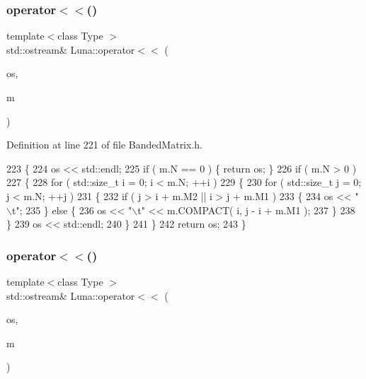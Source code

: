 \subsubsection{\texorpdfstring{operator$<$$<$()}{operator<<()}\hspace{0.1cm}{\footnotesize\ttfamily [2/5]}}
{\footnotesize\ttfamily template$<$class Type $>$ \\
std\+::ostream\& Luna\+::operator$<$$<$ (\begin{DoxyParamCaption}\item[{std\+::ostream \&}]{os,  }\item[{const \hyperlink{classLuna_1_1BandedMatrix}{Banded\+Matrix}$<$ Type $>$ \&}]{m }\end{DoxyParamCaption})\hspace{0.3cm}{\ttfamily [inline]}}



Definition at line 221 of file Banded\+Matrix.\+h.


\begin{DoxyCode}
223   \{
224     os << std::endl;
225     \textcolor{keywordflow}{if} ( m.N == 0 ) \{ \textcolor{keywordflow}{return} os; \}
226     \textcolor{keywordflow}{if} ( m.N > 0 )
227     \{
228       \textcolor{keywordflow}{for} ( std::size\_t i = 0; i < m.N; ++i )
229       \{
230         \textcolor{keywordflow}{for} ( std::size\_t j = 0; j < m.N; ++j )
231         \{
232           \textcolor{keywordflow}{if} ( j > i + m.M2 || i > j + m.M1 )
233           \{
234             os << \textcolor{stringliteral}{"\(\backslash\)t"};
235           \} \textcolor{keywordflow}{else} \{
236             os << \textcolor{stringliteral}{"\(\backslash\)t"} << m.COMPACT( i, j - i + m.M1 );
237           \}
238         \}
239         os << std::endl;
240       \}
241     \}
242     \textcolor{keywordflow}{return} os;
243   \}
\end{DoxyCode}
\mbox{\label{namespaceLuna_ab75cbe7adbaf8d0e078bdbb91be49994}} 
\subsubsection{\texorpdfstring{operator$<$$<$()}{operator<<()}\hspace{0.1cm}{\footnotesize\ttfamily [3/5]}}
{\footnotesize\ttfamily template$<$class Type $>$ \\
std\+::ostream\& Luna\+::operator$<$$<$ (\begin{DoxyParamCaption}\item[{std\+::ostream \&}]{os,  }\item[{const \hyperlink{classLuna_1_1Tridiagonal}{Tridiagonal}$<$ Type $>$ \&}]{m }\end{DoxyParamCaption})\hspace{0.3cm}{\ttfamily [inline]}}



